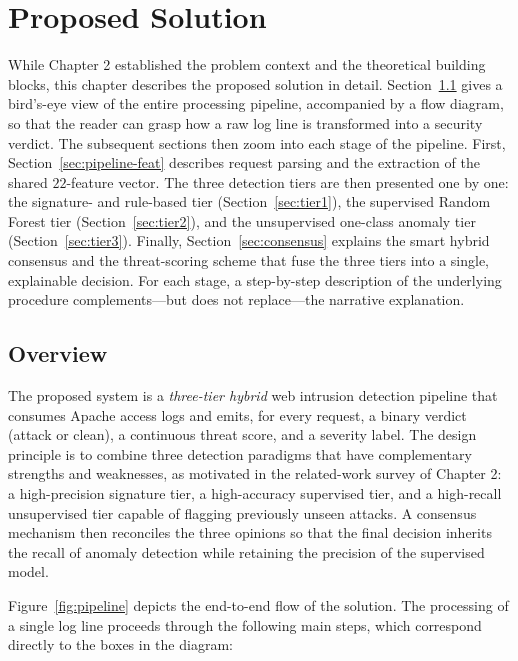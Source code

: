 \documentclass[12pt,a4paper]{report}
\begin{document}

\chapter{Proposed Solution}
\label{chap:solution}

While Chapter 2 established the problem context and the
theoretical building blocks, this chapter describes the proposed solution
in detail. Section~\ref{sec:overview} gives a bird's-eye view of the entire
processing pipeline, accompanied by a flow diagram, so that the reader can
grasp how a raw log line is transformed into a security verdict. The
subsequent sections then zoom into each stage of the pipeline. First,
Section~\ref{sec:pipeline-feat} describes request parsing and the
extraction of the shared $22$-feature vector. The three detection tiers are
then presented one by one: the signature- and rule-based tier
(Section~\ref{sec:tier1}), the supervised Random Forest tier
(Section~\ref{sec:tier2}), and the unsupervised one-class anomaly tier
(Section~\ref{sec:tier3}). Finally, Section~\ref{sec:consensus} explains the
smart hybrid consensus and the threat-scoring scheme that fuse the three
tiers into a single, explainable decision. For each stage, a step-by-step
description of the underlying procedure complements---but does not
replace---the narrative explanation.

\section{Overview}
\label{sec:overview}

The proposed system is a \emph{three-tier hybrid} web intrusion detection
pipeline that consumes Apache access logs and emits, for every request, a
binary verdict (attack or clean), a continuous threat score, and a severity
label. The design principle is to combine three detection paradigms that
have complementary strengths and weaknesses, as motivated in
the related-work survey of Chapter 2: a high-precision signature tier, a
high-accuracy supervised tier, and a high-recall unsupervised tier capable
of flagging previously unseen attacks. A consensus mechanism then reconciles
the three opinions so that the final decision inherits the recall of anomaly
detection while retaining the precision of the supervised model.

Figure~\ref{fig:pipeline} depicts the end-to-end flow of the solution. The
processing of a single log line proceeds through the following main steps,
which correspond directly to the boxes in the diagram:
\end{document}
